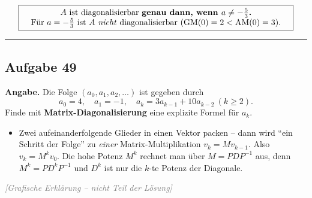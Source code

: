 \documentclass[a4paper,12pt]{article}
\newcommand{\grafik}{\textcolor{gray}{\small\textit{[Grafische Erkl\"arung -- nicht Teil der L\"osung]}}}
\begin{document}
\[
\fbox{\parbox{0.93\textwidth}{\centering
$A$ ist diagonalisierbar \textbf{genau dann, wenn $a \neq -\tfrac{5}{3}$.} \\
F\"ur $a = -\tfrac{5}{3}$ ist $A$ \emph{nicht} diagonalisierbar ($\text{GM}(0)=2 < \text{AM}(0)=3$).
}}
\]

\bigskip
\hrule
\bigskip

\subsection*{Aufgabe 49}

\textbf{Angabe.} Die Folge $(a_0, a_1, a_2, \dots)$ ist gegeben durch
\[
a_0 = 4, \quad a_1 = -1, \quad a_k = 3a_{k-1} + 10 a_{k-2} \ (k \ge 2).
\]
Finde mit \textbf{Matrix-Diagonalisierung} eine explizite Formel f\"ur $a_k$.

\begin{wastun}
\begin{itemize}[leftmargin=*, nosep]
    \item Zwei aufeinanderfolgende Glieder in einen Vektor packen -- dann wird ``ein Schritt der Folge'' zu \emph{einer} Matrix-Multiplikation $v_k = M v_{k-1}$. Also $v_k = M^k v_0$. Die hohe Potenz $M^k$ rechnet man \"uber $M = PDP^{-1}$ aus, denn $M^k = P D^k P^{-1}$ und $D^k$ ist nur die $k$-te Potenz der Diagonale.
\end{itemize}
\end{wastun}

\grafik

\begin{center}
\end{center}
\end{document}
